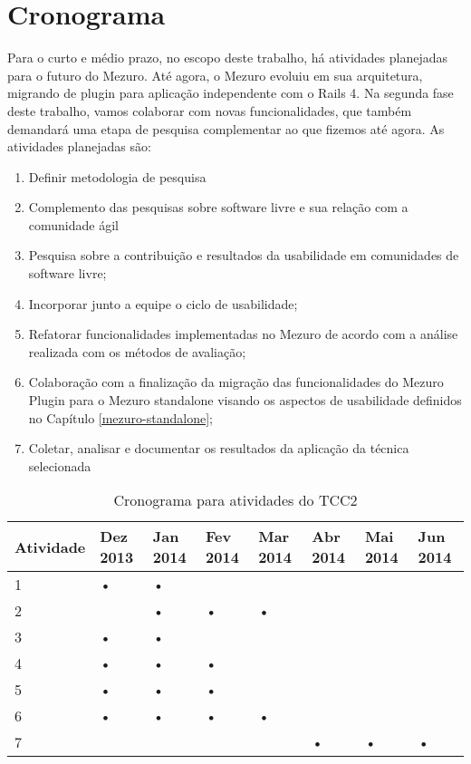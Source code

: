 \section{Cronograma}

Para o curto e médio prazo, no escopo deste trabalho, há atividades planejadas para o futuro do Mezuro. Até agora, o Mezuro evoluiu em sua arquitetura, migrando de plugin para aplicação independente com o Rails 4. Na segunda fase deste trabalho, vamos colaborar com novas funcionalidades, que também demandará uma etapa de pesquisa complementar ao que fizemos até agora. As atividades planejadas são:

\begin{enumerate}
\item Definir metodologia de pesquisa
\item Complemento das pesquisas sobre software livre e sua relação com a comunidade ágil
\item Pesquisa sobre a contribuição e resultados da usabilidade em comunidades de software livre;
\item Incorporar junto a equipe o ciclo de usabilidade;
\item Refatorar funcionalidades implementadas no Mezuro de acordo com a análise realizada com os métodos de avaliação;
\item Colaboração com a finalização da migração das funcionalidades do Mezuro Plugin para o Mezuro standalone visando os aspectos de usabilidade definidos no Capítulo \ref{mezuro-standalone};
\item Coletar, analisar e documentar os resultados da aplicação da técnica selecionada 
\end{enumerate}

\begin{table}[H]
\begin{center}
    \begin{tabular}{ | l | l | l | l | l | l | l | l |}
    \hline
    Atividade & Dez 2013 & Jan 2014 & Fev 2014 & Mar 2014 & Abr 2014 & Mai 2014 & Jun 2014 \\ \hline
    1 & • & • &   &   &   &   &   \\ \hline
    2 &   & • & • & • &   &   &   \\ \hline
    3 & • & • &   &   &   &   &   \\ \hline
    4 & • & • & • &   &   &   &   \\ \hline
    5 & • & • & • &   &   &   &   \\ \hline
    6 & • & • & • & • &   &   &   \\ \hline
    7 &   &   &   &   & • & • & • \\ \hline
    \end{tabular}
    \caption{Cronograma para atividades do TCC2}
    \label{tab-cronograma}
\end{center}
\end{table}

